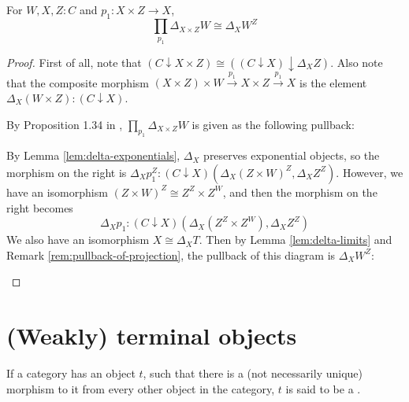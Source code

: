 \begin{lemma}\label{lem:constant-dependent-product}
  For $ W, X, Z : C $ and $ p_1 : X \times Z \to X $,
  \[ \prod_{p_1} \Delta_{X \times Z} W \cong \Delta_X W^Z \]
\end{lemma}
\begin{proof}
  First of all, note that $ (C \downarrow X \times Z) \cong ((C \downarrow X) \downarrow \Delta_X Z) $. Also note that the composite morphism $ (X \times Z) \times W \xrightarrow{p_1} X \times Z \xrightarrow{p_1} X $ is the element $ \Delta_X (W \times Z) : (C \downarrow X) $.

  By Proposition 1.34 in \autocite{freyd}, $ \prod_{p_1} \Delta_{X \times Z} W $ is given as the following pullback:
  \begin{center}
  \end{center}

  By Lemma \ref{lem:delta-exponentials}, $ \Delta_X $ preserves exponential objects, so the morphism on the right is $ \Delta_X p_1^Z : (C \downarrow X)(\Delta_X (Z \times W)^Z, \Delta_X Z^Z) $. However, we have an isomorphism $ (Z \times W)^Z \cong Z^Z \times Z^W $, and then the morphism on the right becomes
  \[ \Delta_X p_1 : (C \downarrow X)(\Delta_X(Z^Z \times Z^W), \Delta_X Z^Z) \]
  We also have an isomorphism $ X \cong \Delta_X T $. Then by Lemma \ref{lem:delta-limits} and Remark \ref{rem:pullback-of-projection}, the pullback of this diagram is $ \Delta_X W^Z $:
  \begin{center}
  \end{center}
\end{proof}


\section{(Weakly) terminal objects}
\begin{definition}
  If a category has an object $ t $, such that there is a (not necessarily unique) morphism to it from every other object in the category, $ t $ is said to be a .
\end{definition}

